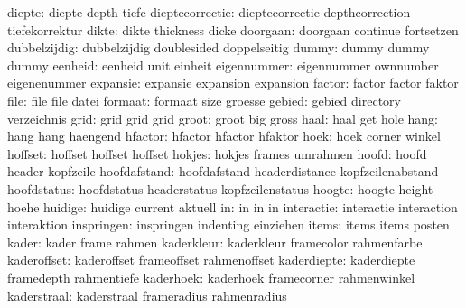              diepte:  diepte               depth               tiefe
    dieptecorrectie:  dieptecorrectie      depthcorrection     tiefekorrektur
              dikte:  dikte                thickness           dicke
           doorgaan:  doorgaan             continue            fortsetzen
       dubbelzijdig:  dubbelzijdig         doublesided         doppelseitig
              dummy:  dummy                dummy               dummy
            eenheid:  eenheid              unit                einheit
        eigennummer:  eigennummer          ownnumber           eigenenummer
           expansie:  expansie             expansion           expansion
             factor:  factor               factor              faktor
               file:  file                 file                datei
            formaat:  formaat              size                groesse
             gebied:  gebied               directory           verzeichnis
               grid:  grid                 grid                grid %
              groot:  groot                big                 gross
               haal:  haal                 get                 hole
               hang:  hang                 hang                haengend
            hfactor:  hfactor              hfactor             hfaktor
               hoek:  hoek                 corner              winkel
            hoffset:  hoffset              hoffset             hoffset
             hokjes:  hokjes               frames              umrahmen
              hoofd:  hoofd                header              kopfzeile
       hoofdafstand:  hoofdafstand         headerdistance      kopfzeilenabstand
        hoofdstatus:  hoofdstatus          headerstatus        kopfzeilenstatus
             hoogte:  hoogte               height              hoehe
            huidige:  huidige              current             aktuell
                 in:  in                   in                  in
         interactie:  interactie           interaction         interaktion
         inspringen:  inspringen           indenting           einziehen
              items:  items                items               posten
              kader:  kader                frame               rahmen
         kaderkleur:  kaderkleur           framecolor          rahmenfarbe
        kaderoffset:  kaderoffset          frameoffset         rahmenoffset
        kaderdiepte:  kaderdiepte          framedepth          rahmentiefe
          kaderhoek:  kaderhoek            framecorner         rahmenwinkel
        kaderstraal:  kaderstraal          frameradius         rahmenradius
